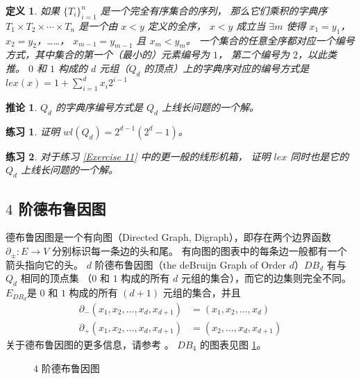 \documentclass[12pt, a4paper]{article}
\newtheorem{corollary}{推论}
\newtheorem{exercise}{练习}
\newtheorem{definition}{定义}
\begin{document}
\begin{definition}
\label{Definition 1}
如果 $\{T_i\}_{i = 1}^n$ 是一个完全有序集合的序列，
那么它们乘积的字典序 $T_1 \times T_2 \times \cdots \times T_n$ 是一个由 $x < y$ 定义的全序，
$x < y$ 成立当 $\exists m$ 使得 $x_1 = y_1$，$x_2 = y_2$，……，
$x_{m - 1} = y_{m - 1}$ 且 $x_m < y_m$。
一个集合的任意全序都对应一个编号方式，其中集合的第一个（最小的）元素编号为 $1$，
第二个编号为 $2$，以此类推。
$0$ 和 $1$ 构成的 $d$ 元组（$Q_d$ 的顶点）上的字典序对应的编号方式是
$lex(x) = 1 + \sum_{i = 1}^d x_i 2^{i - 1}$
\end{definition}

\begin{corollary}
\label{Corollary 4}
$Q_d$ 的字典序编号方式是 $Q_d$ 上线长问题的一个解。
\end{corollary}

\begin{exercise}
\label{Exercise 12}
证明 $wl(Q_d) = 2^{d - 1} (2^d - 1)$。
\end{exercise}

\begin{exercise}
\label{Exercise 13}
对于练习 \ref{Exercise 11} 中的更一般的线形机箱，
证明 $lex$ 同时也是它的 $Q_d$ 上线长问题的一个解。
\end{exercise}

\subsection{$4$ 阶德布鲁因图}
\label{Subsection 3.2}

德布鲁因图是一个有向图（Directed Graph, Digraph），即存在两个边界函数
$\partial_\pm \colon E \rightarrow V$ 分别标识每一条边的头和尾。
有向图的图表中的每条边一般都有一个箭头指向它的头。
$d$ 阶德布鲁因图（the deBruijn Graph of Order $d$）$DB_d$ 有与 $Q_d$ 相同的顶点集
（$0$ 和 $1$ 构成的所有 $d$ 元组的集合），而它的边集则完全不同。
$E_{DB_d}$是 $0$ 和 $1$ 构成的所有 $(d + 1)$ 元组的集合，并且
\begin{align*}
\partial_{-}(x_1, x_2, \dots, x_d, x_{d + 1}) & = (x_1, x_2, \dots, x_d) \\
\partial_{+}(x_1, x_2, \dots, x_d, x_{d + 1}) & = (x_2, \dots, x_d, x_{d + 1})
\end{align*}
关于德布鲁因图的更多信息，请参考 \cite{Golomb.1982}。
$DB_4$ 的图表见图 \ref{Figure 4}。

\begin{figure}
	\centering
	
	\caption{$4$ 阶德布鲁因图}
	\label{Figure 4}
\end{figure}
\end{document}
